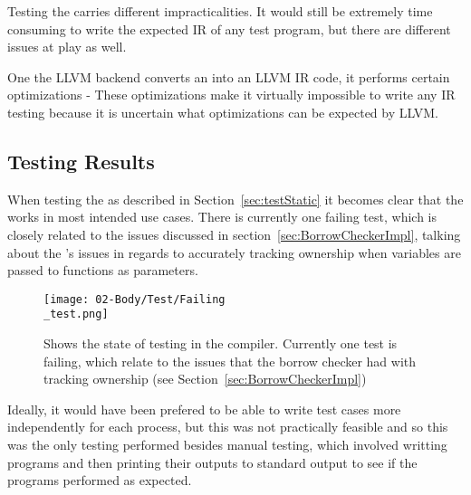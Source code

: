 Testing the \codeGen{} carries different impracticalities. It would still be
extremely time consuming to write the expected IR of any test program, but there are
different issues at play as well. 

One the LLVM backend converts an \ast{} into an LLVM IR code, it performs certain
optimizations - These optimizations make it virtually impossible to write any IR
testing because it is uncertain what optimizations can be expected by LLVM.

\subsection{Testing Results}

When testing the \borrowChecker{} as described in Section~\ref{sec:testStatic} it
becomes clear that the \borrowChecker{} works in most intended use cases. There is
currently one failing test, which is closely related to the issues discussed in
section~\ref{sec:BorrowCheckerImpl}, talking about the \borrowChecker's issues in
regards to accurately tracking ownership when variables are passed to functions as
parameters.

\begin{figure}[ht]
  \texttt{[image: 02-Body/Test/Failing\\\_test.png]}
  \caption{Shows the state of testing in the \lang{} compiler. Currently one test is
  failing, which relate to the issues that the borrow checker had with tracking
ownership (see Section~\ref{sec:BorrowCheckerImpl})}
  \label{fig:failTest}
\end{figure}

Ideally, it would have been prefered to be able to write test cases more
independently for each process, but this was not practically feasible and so this was
the only testing performed besides manual testing, which involved writting programs
and then printing their outputs to standard output to see if the programs performed
as expected.

\newpage
